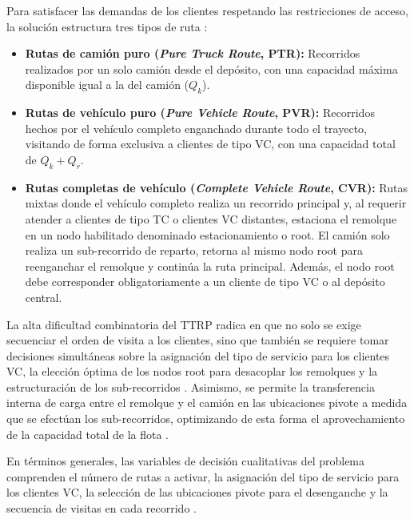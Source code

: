 \documentclass[letter, 10pt]{article}
\begin{document}
Para satisfacer las demandas de los clientes respetando las restricciones de acceso, la soluci\'on estructura tres tipos de ruta \cite{chao2002tabu,lin2009solving}:
\begin{itemize}
    \item \textbf{Rutas de cami\'on puro (\textit{Pure Truck Route}, PTR):} Recorridos realizados por un solo cami\'on desde el dep\'osito, con una capacidad m\'axima disponible igual a la del cami\'on ($Q_k$).
    \item \textbf{Rutas de veh\'iculo puro (\textit{Pure Vehicle Route}, PVR):} Recorridos hechos por el veh\'iculo completo enganchado durante todo el trayecto, visitando de forma exclusiva a clientes de tipo VC, con una capacidad total de $Q_k + Q_r$.
    \item \textbf{Rutas completas de veh\'iculo (\textit{Complete Vehicle Route}, CVR):} Rutas mixtas donde el veh\'iculo completo realiza un recorrido principal y, al requerir atender a clientes de tipo TC o clientes VC distantes, estaciona el remolque en un nodo habilitado denominado estacionamiento o root. El cami\'on solo realiza un sub-recorrido de reparto, retorna al mismo nodo root para reenganchar el remolque y contin\'ua la ruta principal. Adem\'as, el nodo root debe corresponder obligatoriamente a un cliente de tipo VC o al dep\'osito central.
\end{itemize}

La alta dificultad combinatoria del TTRP radica en que no solo se exige secuenciar el orden de visita a los clientes, sino que tambi\'en se requiere tomar decisiones simult\'aneas sobre la asignaci\'on del tipo de servicio para los clientes VC, la elecci\'on \'optima de los nodos root para desacoplar los remolques y la estructuraci\'on de los sub-recorridos \cite{bartolini2020two,lin2009solving}.
Asimismo, se permite la transferencia interna de carga entre el remolque y el cami\'on en las ubicaciones pivote a medida que se efect\'uan los sub-recorridos, optimizando de esta forma el aprovechamiento de la capacidad total de la flota \cite{bartolini2020two}. 

\vspace{0.25cm}

En t\'erminos generales, las variables de decisi\'on cualitativas del problema comprenden el n\'umero de rutas a activar, la asignaci\'on del tipo de servicio para los clientes VC, la selecci\'on de las ubicaciones pivote para el desenganche y la secuencia de visitas en cada recorrido \cite{bartolini2020two,lin2009solving}. 
\end{document}
